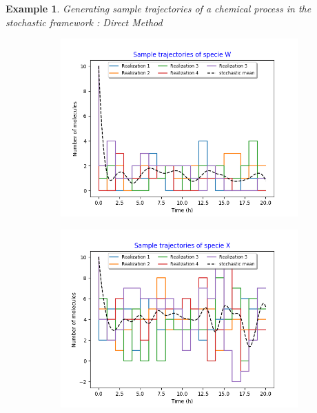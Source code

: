 \documentclass[11pt,a4paper]{article}
\newtheorem{example}[theorem]{Example}
\begin{document}
\begin{example}{Generating sample trajectories of a chemical process in the stochastic framework : Direct Method}
    \begin{figure}[!h]
    \centering
    \begin{subfigure}{.5\textwidth}
      \centering
        \includegraphics[width=1.1\linewidth]{Images/w_5.png}
        \label{fig: Single sample trajectory}
    \end{subfigure}%
    \begin{subfigure}{.5\textwidth}
      \centering
        \includegraphics[width=1.1\linewidth]{Images/x_5.png}
        \label{fig: Single sample trajectory}
    \end{subfigure}

\end{figure}
\end{example}
\end{document}

